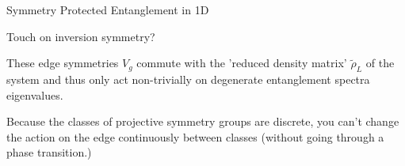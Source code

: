 \begin{frame}{Symmetry Protected Entanglement in 1D}
\vskip-1.5cm

\begin{alert}{Touch on inversion symmetry?}
\end{alert}

\bi 
\item These edge symmetries $V_g$ commute with the 'reduced density matrix' $\tilde{\rho}_L$ of the system and thus only act non-trivially on degenerate entanglement spectra eigenvalues. 

\item Because the classes of projective symmetry groups are discrete, you can't change the action on the edge continuously between classes (without going through a phase transition.)
\ei 

\end{frame}